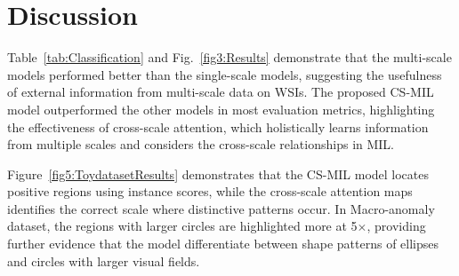 \documentclass[times,twocolumn,final]{elsarticle}
\begin{document}



\section{Discussion}
Table~\ref{tab:Classification} and Fig.~\ref{fig3:Results} demonstrate that the multi-scale models performed better than the single-scale models, suggesting the usefulness of external information from multi-scale data on WSIs. The proposed CS-MIL model outperformed the other models in most evaluation metrics, highlighting the effectiveness of cross-scale attention, which holistically learns information from multiple scales and considers the cross-scale relationships in MIL.

Figure~\ref{fig5:ToydatasetResults} demonstrates that the CS-MIL model locates positive regions using instance scores, while the cross-scale attention maps identifies the correct scale where distinctive patterns occur. In Macro-anomaly dataset, the regions with larger circles are highlighted more at 5$\times$, providing further evidence that the model differentiate between shape patterns of ellipses and circles with larger visual fields.
\end{document}
